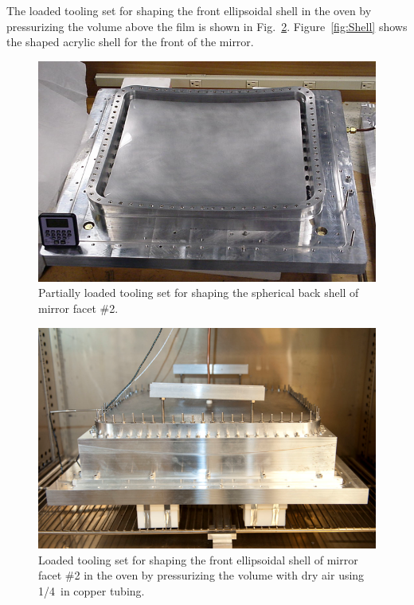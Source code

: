 The loaded tooling set for shaping the front ellipsoidal shell in the oven by pressurizing the volume above the film is
shown in  Fig.~\ref{fig:Pres_Shaping_Front}. Figure~\ref{fig:Shell} shows the shaped acrylic shell for the front of
the mirror.

\begin{figure}[ht]
    \centering
    \includegraphics[width=0.95\linewidth]{images/Vac_Mol_Back.png}
    \caption{Partially loaded tooling set for shaping the spherical back shell of mirror facet \#2.}
    \label{fig:Vac_Mol_Back}
\end{figure}

\begin{figure}[ht]
    \centering
    \includegraphics[width=0.95\linewidth]{images/Pres_Shaping_Front.png}
    \caption{Loaded tooling set for shaping the front ellipsoidal shell of mirror facet \#2 in the oven by pressurizing
      the volume with dry air using 1/4~in copper tubing.}
    \label{fig:Pres_Shaping_Front}
\end{figure}

